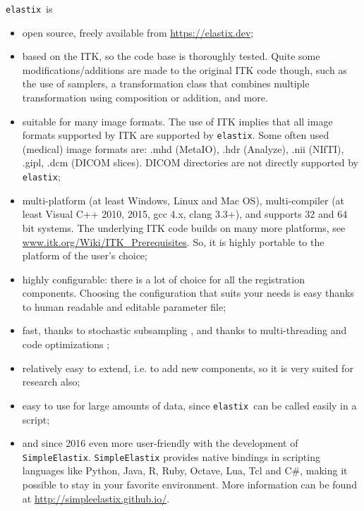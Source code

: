 \documentclass[]{report}
\newcommand{\elastix}{\texttt{elastix}}
\begin{document}
\elastix\ is
\begin{itemize}
\item open source, freely available from \url{https://elastix.dev};

\item based on the ITK, so the code base is thoroughly tested.
Quite some modifications/additions are made to the original ITK
code though, such as the use of samplers, a transformation class
that combines multiple transformation using composition or
addition, and more.

\item suitable for many image formats. The use of ITK implies that all
    image formats supported by ITK are supported by \elastix. Some often
    used (medical) image formats are: .mhd (MetaIO), .hdr (Analyze), .nii
    (NIfTI), .gipl, .dcm (DICOM slices). DICOM directories are not directly
    supported by \elastix;

\item multi-platform (at least Windows, Linux and Mac OS), multi-compiler
    (at least Visual C++ 2010, 2015, gcc 4.x, clang 3.3+), and supports
    32 and 64 bit systems. The underlying ITK code builds on many more
    platforms, see \url{www.itk.org/Wiki/ITK_Prerequisites}. So, it is
    highly portable to the platform of the user's choice;

\item highly configurable: there is a lot of choice for all the registration
components. Choosing the configuration that suits your needs is easy
thanks to human readable and editable parameter file;

\item fast, thanks to stochastic subsampling \cite{KleinEA07}, and thanks to
multi-threading and code optimizations \cite{Shamonin2014};

\item relatively easy to extend, i.e. to add new components, so it is
very suited for research also;

\item easy to use for large amounts of data, since \elastix\ can be
called easily in a script;

\item and since 2016 even more user-friendly with the development of
\texttt{SimpleElastix}. \texttt{SimpleElastix} provides native
bindings in scripting languages like Python, Java, R, Ruby, Octave,
Lua, Tcl and C\#, making it possible to stay in your favorite
environment. More information can be found at
\url{http://simpleelastix.github.io/}.

\end{itemize}
\end{document}
